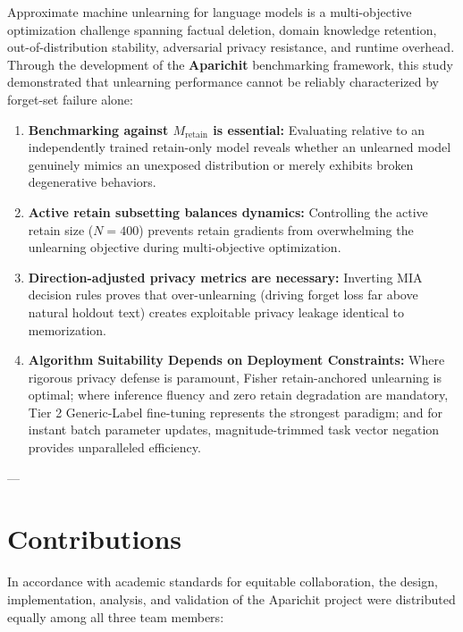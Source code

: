 \documentclass[11pt,a4paper]{article}
\begin{document}
Approximate machine unlearning for language models is a multi-objective optimization challenge spanning factual deletion, domain knowledge retention, out-of-distribution stability, adversarial privacy resistance, and runtime overhead. Through the development of the \textbf{Aparichit} benchmarking framework, this study demonstrated that unlearning performance cannot be reliably characterized by forget-set failure alone:
\begin{enumerate}
    \item \textbf{Benchmarking against $M_{\text{retain}}$ is essential:} Evaluating relative to an independently trained retain-only model reveals whether an unlearned model genuinely mimics an unexposed distribution or merely exhibits broken degenerative behaviors.
    \item \textbf{Active retain subsetting balances dynamics:} Controlling the active retain size ($N=400$) prevents retain gradients from overwhelming the unlearning objective during multi-objective optimization.
    \item \textbf{Direction-adjusted privacy metrics are necessary:} Inverting MIA decision rules proves that over-unlearning (driving forget loss far above natural holdout text) creates exploitable privacy leakage identical to memorization.
    \item \textbf{Algorithm Suitability Depends on Deployment Constraints:} Where rigorous privacy defense is paramount, Fisher retain-anchored unlearning is optimal; where inference fluency and zero retain degradation are mandatory, Tier 2 Generic-Label fine-tuning represents the strongest paradigm; and for instant batch parameter updates, magnitude-trimmed task vector negation provides unparalleled efficiency.
\end{enumerate}

---

\section{Contributions}

In accordance with academic standards for equitable collaboration, the design, implementation, analysis, and validation of the Aparichit project were distributed equally among all three team members:
\end{document}

